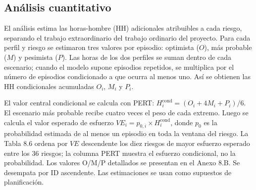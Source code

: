 \subsection{Análisis cuantitativo}

El análisis estima las horas-hombre (HH) adicionales atribuibles a cada riesgo, separando el trabajo extraordinario del trabajo ordinario del proyecto. Para cada perfil y riesgo se estimaron tres valores por episodio: optimista ($O$), más probable ($M$) y pesimista ($P$). Las horas de los dos perfiles se suman dentro de cada escenario; cuando el modelo supone episodios repetidos, se multiplica por el número de episodios condicionado a que ocurra al menos uno. Así se obtienen las HH condicionales acumuladas $O_i$, $M_i$ y $P_i$.

El valor central condicional se calcula con PERT: $H_i^{\mathrm{cond}}=(O_i+4M_i+P_i)/6$. El escenario más probable recibe cuatro veces el peso de cada extremo. Luego se calcula el valor esperado de esfuerzo $VE_i=p_{0,i}\times H_i^{\mathrm{cond}}$, donde $p_0$ es la probabilidad estimada de al menos un episodio en toda la ventana del riesgo. La Tabla 8.6 ordena por $VE$ descendente los diez riesgos de mayor esfuerzo esperado entre los 36 riesgos; la columna PERT muestra el esfuerzo condicional, no la probabilidad. Los valores O/M/P detallados se presentan en el Anexo 8.B. Se desempata por ID ascendente. Las estimaciones se usan como supuestos de planificación.

